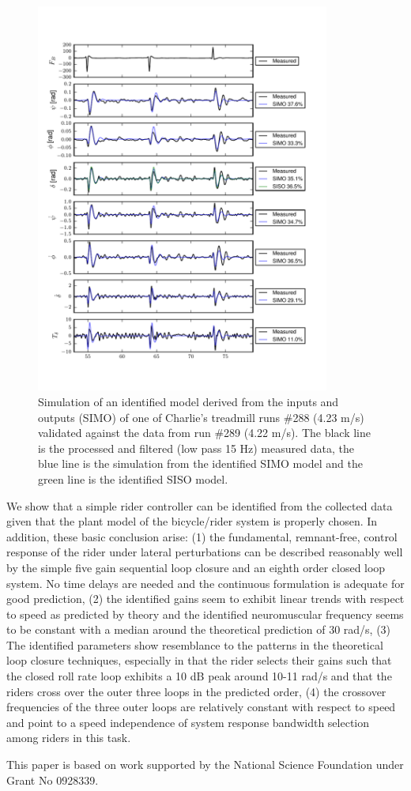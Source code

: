 \documentclass{article}
\begin{document}
\begin{figure}[htb]
  \centering
  \includegraphics[width=3.8in]{rider-id-treadmill-run.pdf}
  \caption{Simulation of an identified model derived from the inputs and
  outputs (SIMO) of one of Charlie's treadmill runs \#288 (4.23 m/s) validated
  against the data from run \#289 (4.22 m/s). The black line is the processed
  and filtered (low pass 15 Hz) measured data, the blue line is the simulation
  from the identified SIMO model and the green line is the identified SISO
  model.}
  \label{fig}
\end{figure}

We show that a simple rider controller can be identified from the collected
data given that the plant model of the bicycle/rider system is properly chosen.
In addition, these basic conclusion arise: (1) the fundamental, remnant-free,
control response of the rider under lateral perturbations can be described
reasonably well by the simple five gain sequential loop closure and an eighth
order closed loop system. No time delays are needed and the continuous
formulation is adequate for good prediction, (2) the identified gains seem to
exhibit linear trends with respect to speed as predicted by theory and the
identified neuromuscular frequency seems to be constant with a median around
the theoretical prediction of 30 rad/s, (3) The identified parameters show
resemblance to the patterns in the theoretical loop closure techniques,
especially in that the rider selects their gains such that the closed roll rate
loop exhibits a 10 dB peak around 10-11 rad/s and that the riders cross over
the outer three loops in the predicted order, (4) the crossover frequencies of
the three outer loops are relatively constant with respect to speed and point
to a speed independence of system response bandwidth selection among riders in
this task.

This paper is based on work supported by the National Science Foundation under
Grant No 0928339.



\end{document}
